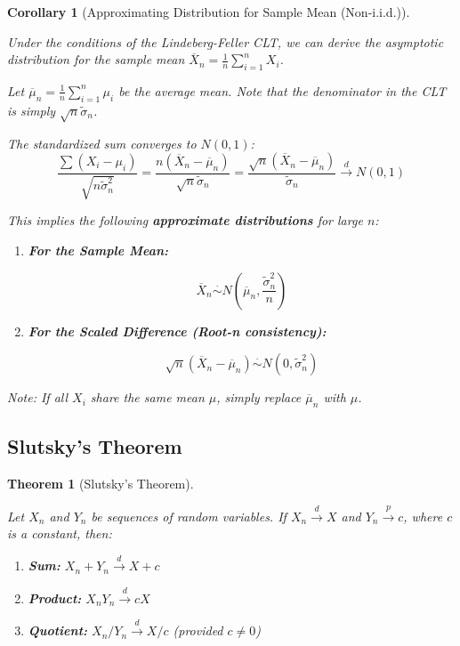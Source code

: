 \documentclass[
  letterpaper,
  DIV=11,
  numbers=noendperiod]{scrreprt}
\renewcommand{\[}{\begin{equation}}
\renewcommand{\]}{\end{equation}}
\theoremstyle{definition}
\theoremstyle{plain}
\theoremstyle{plain}
\newtheorem{corollary}{Corollary}[chapter]
\theoremstyle{plain}
\newtheorem{theorem}{Theorem}[chapter]
\theoremstyle{definition}
\theoremstyle{plain}
\theoremstyle{remark}
\begin{document}
\begin{corollary}[Approximating Distribution for Sample Mean
(Non-i.i.d.)]\protect\hypertarget{cor-lindeberg-feller-approx}{}\label{cor-lindeberg-feller-approx}

Under the conditions of the Lindeberg-Feller CLT, we can derive the
asymptotic distribution for the sample mean
\(\overline{X}_n = \frac{1}{n}\sum_{i=1}^n X_i\).

Let \(\overline{\mu}_n = \frac{1}{n}\sum_{i=1}^n \mu_i\) be the average
mean. Note that the denominator in the CLT is simply
\(\sqrt{n} \tilde{\sigma}_n\).

The standardized sum converges to \(N(0,1)\): \[
\frac{\sum (X_i - \mu_i)}{\sqrt{n \tilde{\sigma}_n^2}} = \frac{n(\overline{X}_n - \overline{\mu}_n)}{\sqrt{n} \tilde{\sigma}_n} = \frac{\sqrt{n}(\overline{X}_n - \overline{\mu}_n)}{\tilde{\sigma}_n} \xrightarrow{d} N(0, 1)
\]

This implies the following \textbf{approximate distributions} for large
\(n\):

\begin{enumerate}
\def\labelenumi{\arabic{enumi}.}
\item
  \textbf{For the Sample Mean:}

  \[
   \overline{X}_n \overset{\cdot}{\sim} N\left(\overline{\mu}_n, \frac{\tilde{\sigma}_n^2}{n}\right)
   \]
\item
  \textbf{For the Scaled Difference (Root-n consistency):}

  \[
   \sqrt{n}(\overline{X}_n - \overline{\mu}_n) \overset{\cdot}{\sim} N\left(0, \tilde{\sigma}_n^2\right)
   \]
\end{enumerate}

\emph{Note: If all \(X_i\) share the same mean \(\mu\), simply replace
\(\overline{\mu}_n\) with \(\mu\).}

\end{corollary}

\subsection{Slutsky's Theorem}\label{slutskys-theorem}

\begin{theorem}[Slutsky's
Theorem]\protect\hypertarget{thm-slutsky}{}\label{thm-slutsky}

Let \(X_n\) and \(Y_n\) be sequences of random variables. If
\(X_n \xrightarrow{d} X\) and \(Y_n \xrightarrow{p} c\), where \(c\) is
a constant, then:

\begin{enumerate}
\def\labelenumi{\arabic{enumi}.}
\item
  \textbf{Sum:} \(X_n + Y_n \xrightarrow{d} X + c\)
\item
  \textbf{Product:} \(X_n Y_n \xrightarrow{d} cX\)
\item
  \textbf{Quotient:} \(X_n / Y_n \xrightarrow{d} X/c\) (provided
  \(c \ne 0\))
\end{enumerate}

\end{theorem}
\end{document}
